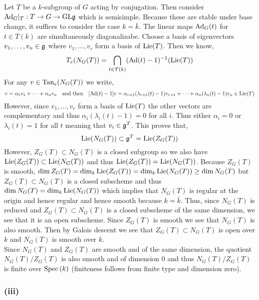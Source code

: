\documentclass[12pt]{article}
\begin{document}
Let $T$ be a $k$-subgroup of $G$ acting by conjugation. Then consider $\mathrm{Ad}_{G}|_T : T \to G \to \mathrm{GL}{\mathfrak{g}}$ which is semisimple. Because these are stable under base change, it suffices to consider the case $k = \bar{k}$. The linear maps $\mathrm{Ad}_G(t)$ for $t \in T(k)$ are simultaneously diagonalizabe. Choose a basis of eigenvectors $v_1, \dots, v_n \in \mathfrak{g}$ where $v_1, \dots, v_r$ form a basis of $\mathrm{Lie}(T)$. Then we know,
\[ T_e(N_G(T)) = \bigcap_{t \in T(k)} (\mathrm{Ad}(t) - 1)^{-1}(\mathrm{Lie}(T)) \]
For any $v \in \mathrm{Tan}_e(N_G(T))$ we write,
\[ v = \alpha_1 v_1 + \cdots + \alpha_n v_n \quad \text{and then} \quad [\mathrm{Ad}(t) - 1]v = \alpha_{r+1} (\lambda_{r+1}(t) - 1) v_{r+1} + \cdots + \alpha_n (\lambda_{n}(t) - 1) v_{n} \in \mathrm{Lie}(T) \]
However, since $v_1, \dots, v_r$ form a basis of $\mathrm{Lie}(T)$ the other vectors are complementary and thus $\alpha_i (\lambda_i(t) - 1) = 0$ for all $i$. Thus either $\alpha_i = 0$ or $\lambda_i(t) = 1$ for all $t$ meaning that $v_i \in \mathfrak{g}^T$. This proves that,
\[ \mathrm{Lie}(N_G(T)) \subset \mathfrak{g}^T = \mathrm{Lie}(Z_G(T)) \]
However, $Z_G(T) \subset N_G(T)$ is a closed subgroup so we also have $\mathrm{Lie}(Z_G(T)) \subset \mathrm{Lie}(N_G(T))$ and thus $\mathrm{Lie}(Z_G(T)) = \mathrm{Lie}(N_G(T))$. Because $Z_G(T)$ is smooth, $\dim{Z_G(T)} = \dim_k \mathrm{Lie}(Z_G(T)) = \dim_k \mathrm{Lie}(N_G(T)) \ge \dim{N_G(T)}$ but $Z_G(T) \subset N_G(T)$ is a closed subscheme and thus $\dim{N_G(T)} = \dim_k \mathrm{Lie}(N_G(T))$ which implies that $N_G(T)$ is regular at the origin and hence regular and hence smooth because $k = \bar{k}$. Thus, since $N_G(T)$ is reduced and $Z_G(T) \subset N_G(T)$ is a closed subscheme of the same dimension, we see that it is an open subscheme. Since $Z_G(T)$ is smooth we see that $N_G(T)$ is also smooth. Then by Galois descent we see that $Z_G(T) \subset N_G(T)$ is open over $k$ and $N_G(T)$ is smooth over $k$.
\bigskip\\
Since $N_G(T)$ and $Z_G(T)$ are smooth and of the same dimension, the quotient $N_G(T)/Z_G(T)$ is also smooth and of dimension $0$ and thus $N_G(T) / Z_G(T)$ is finite \etale over $\mathrm{Spec}\left( k \right)$ (finiteness follows from finite type and dimension zero).

\subsubsection{(iii)}

\renewcommand{\End}[2]{\mathrm{End}_{#1}\left( #2 \right)}
\end{document}
